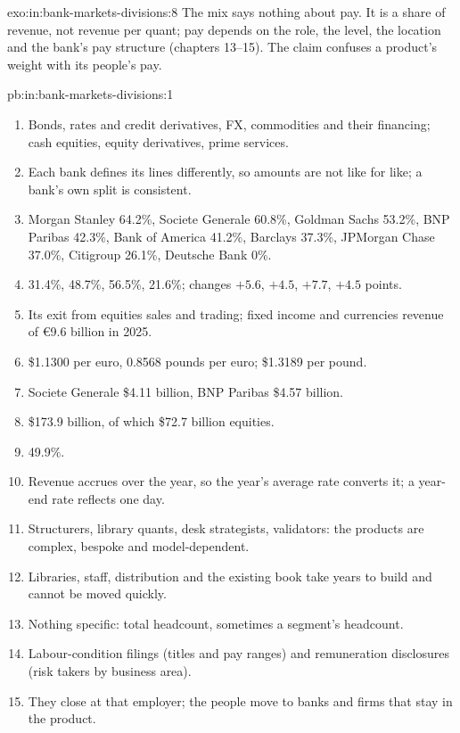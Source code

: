 \begin{solution}{exo:in:bank-markets-divisions:8}
The mix says nothing about pay. It is a share of revenue, not revenue per quant; pay depends on the role, the level,
the location and the bank's pay structure (chapters 13--15). The claim confuses a product's weight with its people's pay.
\end{solution}

\begin{solution}{pb:in:bank-markets-divisions:1}
\begin{enumerate}
\item Bonds, rates and credit derivatives, FX, commodities and their financing; cash equities, equity derivatives,
prime services.
\item Each bank defines its lines differently, so amounts are not like for like; a bank's own split is consistent.
\item Morgan Stanley 64.2\%, Societe Generale 60.8\%, Goldman Sachs 53.2\%, BNP Paribas 42.3\%, Bank of America 41.2\%,
Barclays 37.3\%, JPMorgan Chase 37.0\%, Citigroup 26.1\%, Deutsche Bank 0\%.
\item 31.4\%, 48.7\%, 56.5\%, 21.6\%; changes $+5.6$, $+4.5$, $+7.7$, $+4.5$ points.
\item Its exit from equities sales and trading; fixed income and currencies revenue of \euro9.6 billion in 2025.
\item \$1.1300 per euro, 0.8568 pounds per euro; \$1.3189 per pound.
\item Societe Generale \$4.11 billion, BNP Paribas \$4.57 billion.
\item \$173.9 billion, of which \$72.7 billion equities.
\item 49.9\%.
\item Revenue accrues over the year, so the year's average rate converts it; a year-end rate reflects one day.
\item Structurers, library quants, desk strategists, validators: the products are complex, bespoke and model-dependent.
\item Libraries, staff, distribution and the existing book take years to build and cannot be moved quickly.
\item Nothing specific: total headcount, sometimes a segment's headcount.
\item Labour-condition filings (titles and pay ranges) and remuneration disclosures (risk takers by business area).
\item They close at that employer; the people move to banks and firms that stay in the product.

\end{enumerate}
\end{solution}
